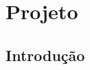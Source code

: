 \documentclass[
	12pt,				%
	openright,			%
	twoside,			%
	a4paper,			%
	english,			%
	brazil,				%
	]{abntex2}
\begin{document}
\chapter{Projeto}
\section{Introdução}





\end{document}
